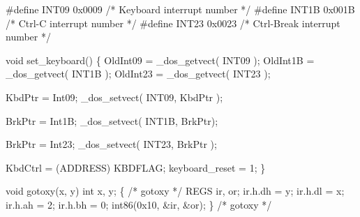 \documentclass[
  letterpaper,
  DIV=11,
  numbers=noendperiod]{scrartcl}
\newenvironment{Shaded}{\begin{snugshade}}{\end{snugshade}}
\newcommand{\BaseNTok}[1]{\textcolor[rgb]{0.68,0.00,0.00}{#1}}
\newcommand{\CommentTok}[1]{\textcolor[rgb]{0.37,0.37,0.37}{#1}}
\newcommand{\DataTypeTok}[1]{\textcolor[rgb]{0.68,0.00,0.00}{#1}}
\newcommand{\DecValTok}[1]{\textcolor[rgb]{0.68,0.00,0.00}{#1}}
\newcommand{\NormalTok}[1]{\textcolor[rgb]{0.00,0.23,0.31}{#1}}
\newcommand{\OperatorTok}[1]{\textcolor[rgb]{0.37,0.37,0.37}{#1}}
\newcommand{\PreprocessorTok}[1]{\textcolor[rgb]{0.68,0.00,0.00}{#1}}
\begin{document}
\begin{Shaded}
\begin{Highlighting}[]
\PreprocessorTok{\#define INT09   }\BaseNTok{0x0009}\PreprocessorTok{      }\CommentTok{/* Keyboard interrupt number           */}
\PreprocessorTok{\#define INT1B   }\BaseNTok{0x001B}\PreprocessorTok{      }\CommentTok{/* Ctrl{-}C interrupt number             */}
\PreprocessorTok{\#define INT23   }\BaseNTok{0x0023}\PreprocessorTok{      }\CommentTok{/* Ctrl{-}Break interrupt number         */}

\DataTypeTok{void}\NormalTok{ set\_keyboard}\OperatorTok{()}
    \OperatorTok{\{}
\NormalTok{       OldInt09 }\OperatorTok{=}\NormalTok{ \_dos\_getvect}\OperatorTok{(}\NormalTok{ INT09 }\OperatorTok{);}
\NormalTok{       OldInt1B }\OperatorTok{=}\NormalTok{ \_dos\_getvect}\OperatorTok{(}\NormalTok{ INT1B }\OperatorTok{);}
\NormalTok{       OldInt23 }\OperatorTok{=}\NormalTok{ \_dos\_getvect}\OperatorTok{(}\NormalTok{ INT23 }\OperatorTok{);}

\NormalTok{       KbdPtr }\OperatorTok{=}\NormalTok{ Int09}\OperatorTok{;}
\NormalTok{       \_dos\_setvect}\OperatorTok{(}\NormalTok{ INT09}\OperatorTok{,}\NormalTok{ KbdPtr }\OperatorTok{);}

\NormalTok{       BrkPtr }\OperatorTok{=}\NormalTok{ Int1B}\OperatorTok{;}
\NormalTok{       \_dos\_setvect}\OperatorTok{(}\NormalTok{ INT1B}\OperatorTok{,}\NormalTok{ BrkPtr}\OperatorTok{);}

\NormalTok{       BrkPtr }\OperatorTok{=}\NormalTok{ Int23}\OperatorTok{;}
\NormalTok{       \_dos\_setvect}\OperatorTok{(}\NormalTok{ INT23}\OperatorTok{,}\NormalTok{ BrkPtr }\OperatorTok{);}

\NormalTok{       KbdCtrl  }\OperatorTok{=} \OperatorTok{(}\NormalTok{ADDRESS}\OperatorTok{)}\NormalTok{ KBDFLAG}\OperatorTok{;}
\NormalTok{       keyboard\_reset }\OperatorTok{=} \DecValTok{1}\OperatorTok{;}
    \OperatorTok{\}}

\DataTypeTok{void}\NormalTok{ gotoxy}\OperatorTok{(}\NormalTok{x}\OperatorTok{,}\NormalTok{ y}\OperatorTok{)}
\DataTypeTok{int}\NormalTok{ x}\OperatorTok{,}\NormalTok{ y}\OperatorTok{;}
    \OperatorTok{\{}                   \CommentTok{/* gotoxy */}
\NormalTok{    REGS ir}\OperatorTok{,}\NormalTok{ or}\OperatorTok{;}
\NormalTok{    ir}\OperatorTok{.}\NormalTok{h}\OperatorTok{.}\NormalTok{dh }\OperatorTok{=}\NormalTok{ y}\OperatorTok{;}
\NormalTok{    ir}\OperatorTok{.}\NormalTok{h}\OperatorTok{.}\NormalTok{dl }\OperatorTok{=}\NormalTok{ x}\OperatorTok{;}
\NormalTok{    ir}\OperatorTok{.}\NormalTok{h}\OperatorTok{.}\NormalTok{ah }\OperatorTok{=} \DecValTok{2}\OperatorTok{;}
\NormalTok{    ir}\OperatorTok{.}\NormalTok{h}\OperatorTok{.}\NormalTok{bh }\OperatorTok{=} \DecValTok{0}\OperatorTok{;}
\NormalTok{    int86}\OperatorTok{(}\BaseNTok{0x10}\OperatorTok{,} \OperatorTok{\&}\NormalTok{ir}\OperatorTok{,} \OperatorTok{\&}\NormalTok{or}\OperatorTok{);}
    \OperatorTok{\}}                   \CommentTok{/* gotoxy */}
\end{Highlighting}
\end{Shaded}
\end{document}
